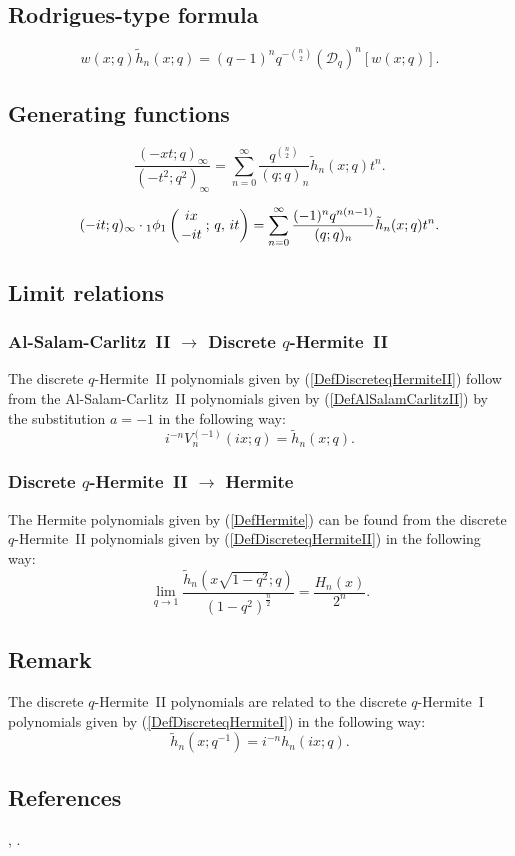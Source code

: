 \documentclass[envcountchap,graybox]{svmono}
\newcounter{rom}
\newcommand{\qhyp}[5]{\mbox{}_{#1}{\phi}_{#2}
\left(\genfrac{}{}{0pt}{}{#3}{#4}\,;\,q,\,#5\right)}
\begin{document}
\subsection*{Rodrigues-type formula}
\begin{equation}
\label{RodDiscreteqHermiteII}
w(x;q)\tilde{h}_n(x;q)=(q-1)^nq^{-\binom{n}{2}}
\left(\mathcal{D}_q\right)^n\left[w(x;q)\right].
\end{equation}

\subsection*{Generating functions}
\begin{equation}
\label{GenDiscreteqHermiteII1}
\frac{(-xt;q)_{\infty}}{(-t^2;q^2)_{\infty}}=\sum_{n=0}^{\infty}
\frac{q^{\binom{n}{2}}}{(q;q)_n}{\tilde h}_n(x;q)t^n.
\end{equation}

\begin{equation}
\label{GenDiscreteqHermiteII2}
(-it;q)_{\infty}\cdot\qhyp{1}{1}{ix}{-it}{it}=\sum_{n=0}^{\infty}
\frac{(-1)^nq^{n(n-1)}}{(q;q)_n}{\tilde h}_n(x;q)t^n.
\end{equation}

\subsection*{Limit relations}

\subsubsection*{Al-Salam-Carlitz~II $\rightarrow$ Discrete $q$-Hermite~II}
The discrete $q$-Hermite~II polynomials given by
(\ref{DefDiscreteqHermiteII}) follow from the Al-Salam-Carlitz~II
polynomials given by (\ref{DefAlSalamCarlitzII}) by the substitution $a=-1$
in the following way:
$$i^{-n}V_n^{(-1)}(ix;q)={\tilde h}_n(x;q).$$

\subsubsection*{Discrete $q$-Hermite~II $\rightarrow$ Hermite}
The Hermite polynomials given by (\ref{DefHermite}) can be found
from the discrete $q$-Hermite~II polynomials given by
(\ref{DefDiscreteqHermiteII}) in the following way:
\begin{equation}
\lim_{q\rightarrow 1}\frac{{\tilde h}_n(x\sqrt{1-q^2};q)}
{(1-q^2)^{\frac{n}{2}}}=\frac{H_n(x)}{2^n}.
\end{equation}

\subsection*{Remark} The discrete $q$-Hermite~II polynomials are related to the
discrete $q$-Hermite~I polynomials given by (\ref{DefDiscreteqHermiteI})
in the following way:
$${\tilde h}_n(x;q^{-1})=i^{-n}h_n(ix;q).$$

\subsection*{References}
\cite{BergIsmail}, \cite{Koorn97}.
\end{document}
